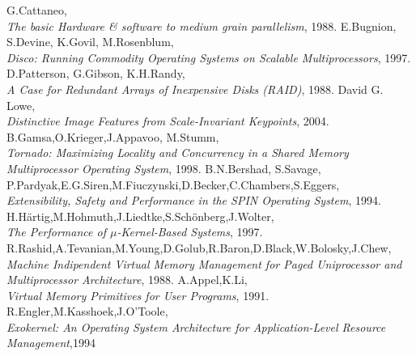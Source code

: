 \begin{thebibliography}{9}
  G.Cattaneo,\\ 
  \textit{The basic Hardware \& software to medium grain parallelism}, 1988.
  E.Bugnion, S.Devine, K.Govil, M.Rosenblum,\\
  \textit{Disco: Running Commodity Operating Systems on Scalable Multiprocessors}, 1997.
  D.Patterson, G.Gibson, K.H.Randy,\\ 
  \textit{A Case for Redundant Arrays of Inexpensive Disks (RAID)}, 1988.
  David G. Lowe,\\
  \textit{Distinctive Image Features from Scale-Invariant Keypoints}, 2004.
  B.Gamsa,O.Krieger,J.Appavoo, M.Stumm,\\ 
  \textit{Tornado: Maximizing Locality and Concurrency in a Shared Memory Multiprocessor Operating System}, 1998.
  B.N.Bershad, S.Savage, P.Pardyak,E.G.Siren,M.Fiuczynski,D.Becker,C.Chambers,S.Eggers,\\
  \textit{Extensibility, Safety and Performance in the SPIN Operating System}, 1994.
  H.H\"{a}rtig,M.Hohmuth,J.Liedtke,S.Sch\"{o}nberg,J.Wolter,\\ 
  \textit{The Performance of $\mu$-Kernel-Based Systems}, 1997.
  R.Rashid,A.Tevanian,M.Young,D.Golub,R.Baron,D.Black,W.Bolosky,J.Chew,\\
  \textit{Machine Indipendent Virtual Memory Management for Paged Uniprocessor and Multiprocessor Architecture}, 1988.
  A.Appel,K.Li,\\
  \textit{Virtual Memory Primitives for User Programs}, 1991.
  R.Engler,M.Kasshoek,J.O'Toole, \\
  \textit{Exokernel: An Operating System Architecture for Application-Level Resource Management},1994
\end{thebibliography}
